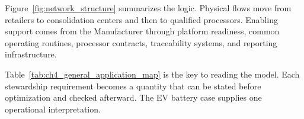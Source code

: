 Figure~\ref{fig:network_structure} summarizes the logic. Physical flows move from retailers to consolidation centers and then to qualified processors. Enabling support comes from the Manufacturer through platform readiness, common operating routines, processor contracts, traceability systems, and reporting infrastructure.

\begin{table}[htbp]
\centering
\caption{Direct Stewardship Inputs and Their EV Battery Application}
\label{tab:ch4_general_application_map}
\end{table}

Table~\ref{tab:ch4_general_application_map} is the key to reading the model. Each stewardship requirement becomes a quantity that can be stated before optimization and checked afterward. The EV battery case supplies one operational interpretation.

